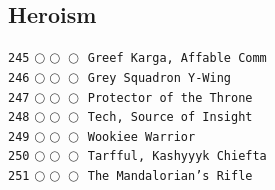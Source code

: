 \documentclass[a4paper,landscape]{article}
\begin{document}
\begin{multicols*}{5}
\section{Heroism} 
\vspace{-2mm} 
\texttt{245} \(\bigcirc\!\bigcirc\!\bigcirc\)  \texttt{Greef Karga, Affable Comm} \vspace{-0.3mm}\\ 
\texttt{246} \(\bigcirc\!\bigcirc\!\bigcirc\)  \texttt{Grey Squadron Y-Wing} \vspace{-0.3mm}\\ 
\texttt{247} \(\bigcirc\!\bigcirc\!\bigcirc\)  \texttt{Protector of the Throne} \vspace{-0.3mm}\\ 
\texttt{248} \(\bigcirc\!\bigcirc\!\bigcirc\)  \texttt{Tech, Source of Insight} \vspace{-0.3mm}\\ 
\texttt{249} \(\bigcirc\!\bigcirc\!\bigcirc\)  \texttt{Wookiee Warrior} \vspace{-0.3mm}\\ 
\texttt{250} \(\bigcirc\!\bigcirc\!\bigcirc\)  \texttt{Tarfful, Kashyyyk Chiefta} \vspace{-0.3mm}\\ 
\texttt{251} \(\bigcirc\!\bigcirc\!\bigcirc\)  \texttt{The Mandalorian’s Rifle} \vspace{-0.3mm}\\ 

\end{multicols*}
\end{document}

